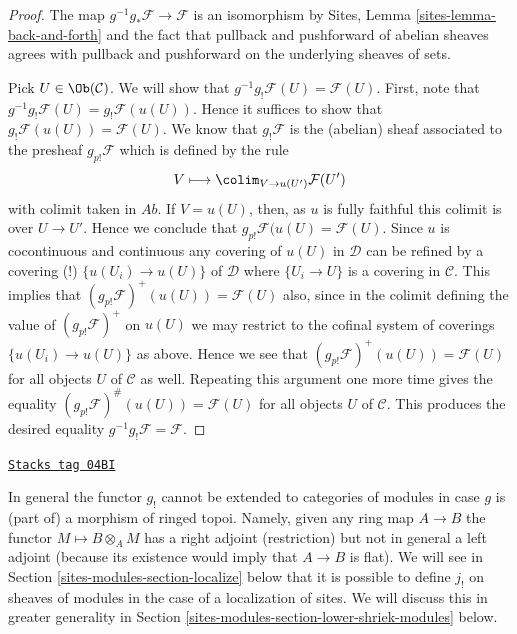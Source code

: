 \begin{proof}
The map $g^{-1}g_*\mathcal{F} \to \mathcal{F}$ is an isomorphism
by Sites, Lemma \ref{sites-lemma-back-and-forth} and the fact that
pullback and pushforward of abelian sheaves agrees with
pullback and pushforward on the underlying sheaves of sets.

\medskip\noindent
Pick $U \in \Ob(\mathcal{C})$. We will show that
$g^{-1}g_!\mathcal{F}(U) = \mathcal{F}(U)$. First, note that
$g^{-1}g_!\mathcal{F}(U) = g_!\mathcal{F}(u(U))$. Hence it suffices
to show that $g_!\mathcal{F}(u(U)) = \mathcal{F}(U)$.
We know that $g_!\mathcal{F}$ is the (abelian) sheaf associated
to the presheaf $g_{p!}\mathcal{F}$ which is defined by the rule
$$
V \longmapsto \colim_{V \to u(U')} \mathcal{F}(U')
$$
with colimit taken in $\textit{Ab}$. If $V = u(U)$, then, as $u$ is
fully faithful this colimit is over $U \to U'$. Hence we conclude
that $g_{p!}\mathcal{F}(u(U) = \mathcal{F}(U)$.
Since $u$ is cocontinuous and continuous any covering of $u(U)$ in
$\mathcal{D}$ can be refined by a covering (!) $\{u(U_i) \to u(U)\}$
of $\mathcal{D}$ where $\{U_i \to U\}$ is a covering in $\mathcal{C}$.
This implies that $(g_{p!}\mathcal{F})^+(u(U)) = \mathcal{F}(U)$ also,
since in the colimit defining the value of $(g_{p!}\mathcal{F})^+$
on $u(U)$ we may restrict to the cofinal system of coverings
$\{u(U_i) \to u(U)\}$ as above. Hence we see that
$(g_{p!}\mathcal{F})^+(u(U)) = \mathcal{F}(U)$ for all objects $U$
of $\mathcal{C}$ as well. Repeating this argument one more time
gives the equality $(g_{p!}\mathcal{F})^\#(u(U)) = \mathcal{F}(U)$
for all objects $U$ of $\mathcal{C}$. This produces the desired
equality $g^{-1}g_!\mathcal{F} = \mathcal{F}$.
\end{proof}

\begin{remark}[No extension]
\label{sites-modules-remark-no-extension}
\href{https://stacks.math.columbia.edu/tag/04BI}{\texttt{Stacks tag 04BI}}

In general the functor $g_!$ cannot be extended to categories of modules
in case $g$ is (part of) a morphism of ringed topoi. Namely, given any
ring map $A \to B$ the functor $M \mapsto B \otimes_A M$ has a right adjoint
(restriction) but not in general a left adjoint (because its existence
would imply that $A \to B$ is flat). We will see in
Section \ref{sites-modules-section-localize}
below that it is possible to define $j_!$ on sheaves of modules
in the case of a localization of sites.
We will discuss this in greater generality in
Section \ref{sites-modules-section-lower-shriek-modules} below.
\end{remark}


